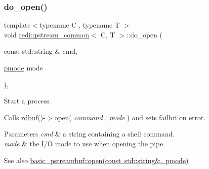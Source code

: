 \subsubsection{\texorpdfstring{do\+\_\+open()}{do\_open()}\hspace{0.1cm}{\footnotesize\ttfamily [1/2]}}
{\footnotesize\ttfamily template$<$typename C , typename T $>$ \\
void \mbox{\hyperlink{classredi_1_1pstream__common}{redi\+::pstream\+\_\+common}}$<$ C, T $>$\+::do\+\_\+open (\begin{DoxyParamCaption}\item[{const std\+::string \&}]{cmd,  }\item[{\mbox{\hyperlink{structredi_1_1pstreams_a1eae4aad88812af03a0fbb3ec13c50b7}{pmode}}}]{mode }\end{DoxyParamCaption})\hspace{0.3cm}{\ttfamily [inline]}, {\ttfamily [protected]}}



Start a process. 

Calls \mbox{\hyperlink{classredi_1_1pstream__common_a5414d5a3f3d91a9483d5c9128434db26}{rdbuf()}}-\/$>$open( {\itshape command} , {\itshape mode} ) and sets {\ttfamily failbit} on error.


\begin{DoxyParams}{Parameters}
{\em cmd} & a string containing a shell command. \\
\hline
{\em mode} & the I/O mode to use when opening the pipe. \\
\hline
\end{DoxyParams}
\begin{DoxySeeAlso}{See also}
\mbox{\hyperlink{classredi_1_1basic__pstreambuf_ac91e4317d9e95b4551513a00e3d82996}{basic\+\_\+pstreambuf\+::open(const std\+::string\&, pmode)}} 
\end{DoxySeeAlso}
\mbox{\label{classredi_1_1pstream__common_a352b77fa600f7ebe0d8f1582be05ae4d}} 
